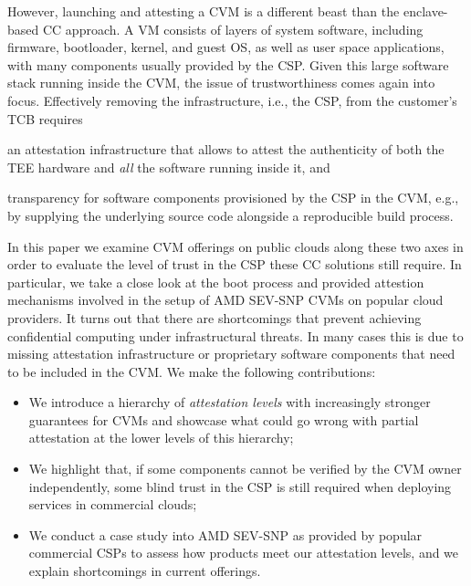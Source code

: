 However, launching and attesting a \ac{CVM} is a different beast than the
enclave-based \ac{CC} approach. A VM consists of layers of system software,
including firmware, bootloader, kernel, and guest OS, as well as user space
applications, with many components usually provided by the \ac{CSP}.
%
Given this large software stack running inside the \ac{CVM}, the issue of
trustworthiness comes again into focus. Effectively removing the infrastructure,
i.e., the \ac{CSP}, from the customer's \ac{TCB} requires
\begin{inparaenum}
\item an attestation infrastructure that allows to attest the authenticity of
  both the \ac{TEE} hardware and \emph{all} the software running inside it, and
\item transparency for software components provisioned by the \ac{CSP} in the
  \ac{CVM}, e.g., by supplying the underlying source code alongside a
  reproducible build process.
\end{inparaenum}

In this paper we examine \ac{CVM} offerings on public clouds along these two
axes in order to evaluate the level of trust in the \ac{CSP} these \ac{CC}
solutions still require.  In particular, we take a close look at the boot
process and provided attestion mechanisms involved in the setup of AMD SEV-SNP
\acp{CVM} on popular cloud providers. It turns out that there are shortcomings
that prevent achieving confidential computing under infrastructural threats. In
many cases this is due to missing attestation infrastructure or proprietary
software components that need to be included in the \ac{CVM}.
We make the following contributions:
%
\begin{itemize}
%
    \item We introduce a hierarchy of \emph{attestation levels} with
increasingly stronger guarantees for \acp{CVM} and showcase what could go
wrong with partial attestation at the lower levels of this hierarchy;
%
    \item We highlight that, if some components cannot be verified by the
    \ac{CVM} owner independently, some blind trust in the \ac{CSP} is still
    required when deploying services in commercial clouds;
%
    \item We conduct a case study into AMD SEV-SNP as provided by popular
commercial \acp{CSP} to assess how products meet our attestation levels, and we
explain shortcomings in current offerings.
%
\end{itemize}

